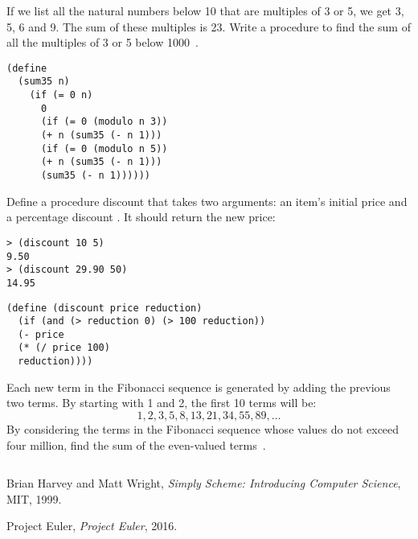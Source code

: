 

\begin{questions}

\question
If we list all the natural numbers below 10 that are multiples of 3 or 5, we get 3, 5, 6 and 9. The sum of these multiples is 23.
Write a procedure to find the sum of all the multiples of 3 or 5 below 1000~\cite{projecteuler}.

\begin{solution}
  \begin{verbatim}
(define 
  (sum35 n)
    (if (= 0 n)
      0
      (if (= 0 (modulo n 3))
      (+ n (sum35 (- n 1)))
      (if (= 0 (modulo n 5))
      (+ n (sum35 (- n 1)))
      (sum35 (- n 1))))))
  \end{verbatim}
\end{solution}



\question
Define a procedure discount that takes two arguments: an item’s initial price and a percentage discount \cite{simplyscheme}.
It should return the new price:
\begin{verbatim}
> (discount 10 5)
9.50
> (discount 29.90 50)
14.95
\end{verbatim}
  
  
\begin{solution}
  \begin{verbatim}
(define (discount price reduction)
  (if (and (> reduction 0) (> 100 reduction))
  (- price
  (* (/ price 100)
  reduction))))
\end{verbatim}
\end{solution}

\question
Each new term in the Fibonacci sequence is generated by adding the previous two terms.
By starting with 1 and 2, the first 10 terms will be:
\[ 1, 2, 3, 5, 8, 13, 21, 34, 55, 89, \ldots \]
By considering the terms in the Fibonacci sequence whose values do not exceed four million, find the sum of the even-valued terms~\cite{projecteuler}.

\begin{solution}
  \begin{verbatim}

  \end{verbatim}
\end{solution}

\end{questions}

\begin{thebibliography}{12}
  
  Brian Harvey and Matt Wright,
  \emph{Simply Scheme: Introducing Computer Science},
  MIT,
  1999.
  
  Project Euler,
  \emph{Project Euler},
  2016.

\end{thebibliography}
